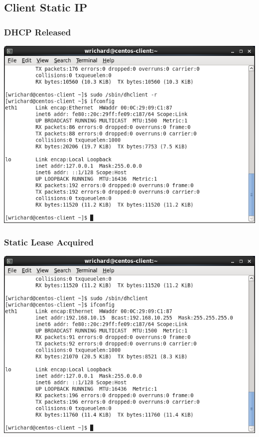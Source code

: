 \documentclass[a4paper,10pt]{article}
\begin{document}
\subsection{Client Static IP}
  \subsubsection{DHCP Released}
    \begin{center}
    \includegraphics[width=\linewidth]{./dhclient-r.png}
    \end{center}
  \subsubsection{Static Lease Acquired}
    \begin{center}
    \includegraphics[width=\linewidth]{./dhclient-new-addr.png}
    \end{center}
\end{document}
